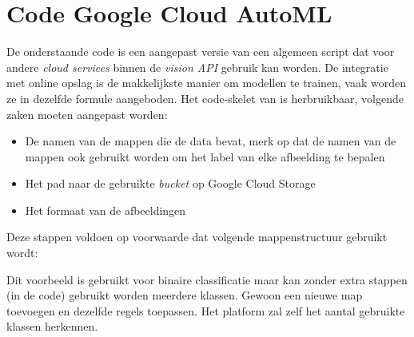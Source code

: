 
\chapter{Code Google Cloud AutoML}
\label{ch:app:google-automl}

De onderstaande code is een aangepast versie van een algemeen script dat voor andere \textit{cloud services} binnen de \textit{vision API} gebruik kan worden. De integratie met online opslag is de makkelijkste manier om modellen te trainen, vaak worden ze in dezelfde formule aangeboden. Het code-skelet van \textcite{Guo2018} is herbruikbaar, volgende zaken moeten aangepast worden:

\begin{itemize}
    \item De namen van de mappen die de data bevat, merk op dat de namen van de mappen ook gebruikt worden om het label van elke afbeelding te bepalen
    \item Het pad naar de gebruikte \textit{bucket} op Google Cloud Storage
    \item Het formaat van de afbeeldingen
\end{itemize}

Deze stappen voldoen op voorwaarde dat volgende mappenstructuur gebruikt wordt:


Dit voorbeeld is gebruikt voor binaire classificatie maar kan zonder extra stappen (in de code) gebruikt worden meerdere klassen. Gewoon een nieuwe map toevoegen en dezelfde regels toepassen. Het platform zal zelf het aantal gebruikte klassen herkennen.

